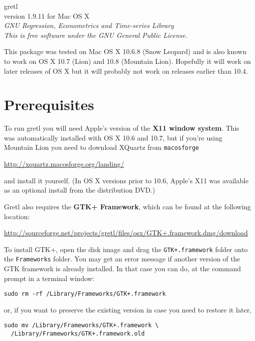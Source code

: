 \documentclass[11pt]{article}
\begin{document}
\begin{center}
{\color{gold} \titlefont gretl} \\[1ex]
version 1.9.11 for Mac OS X \\[2ex]

\textit{GNU Regression, Econometrics and Time-series Library\\
  This is free software under the GNU General Public License.}

\end{center}

This package was tested on Mac OS X 10.6.8 (Snow Leopard) and
is also known to work on OS X 10.7 (Lion) and 10.8 (Mountain Lion).
Hopefully it will work on later releases of OS X but it will probably
not work on releases earlier than 10.4.

\section{Prerequisites}
\label{sec:os}

To run \textsf{gretl} you will need Apple's version of the \textbf{X11
  window system}. This was automatically installed with OS X 10.6 and
10.7, but if you're using Mountain Lion you need to download XQuartz
from \texttt{macosforge}

\url{http://xquartz.macosforge.org/landing/}

and install it yourself. (In OS X versions prior to 10.6, Apple's X11 was 
available as an optional install from the distribution DVD.)

\textsf{Gretl} also requires the \textbf{GTK+ Framework}, which can be
found at the following location:

\url{http://sourceforge.net/projects/gretl/files/osx/GTK+.framework.dmg/download}

To install GTK+, open the disk image and drag the
\texttt{GTK+.framework} folder onto the \texttt{Frameworks}
folder. You may get an error message if another version of the GTK
framework is already installed. In that case you can do, at the
command prompt in a terminal window:

\verb|sudo rm -rf /Library/Frameworks/GTK+.framework|

or, if you want to preserve the existing version in case you need to
restore it later,
\begin{verbatim}
sudo mv /Library/Frameworks/GTK+.framework \
  /Library/Frameworks/GTK+.framework.old
\end{verbatim}
\end{document}
